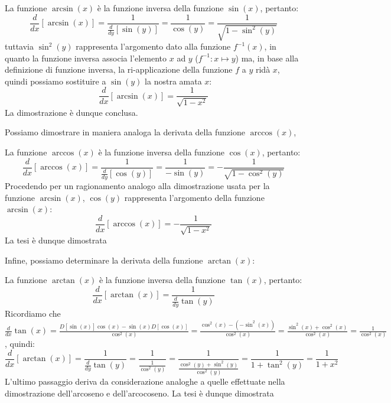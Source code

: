 \documentclass{report}
\begin{document}
\begin{myproof}
La funzione $\arcsin(x)$ è la funzione inversa della funzione $\sin(x)$, pertanto:
$$
	\frac{d}{dx}[\arcsin(x)] = \frac{1}{\frac{d}{dy}[\sin(y)]} = \frac{1}{\cos(y)} = \frac{1}{\sqrt{1-\sin^2(y)}}
$$
tuttavia $\sin^2(y)$ rappresenta l'argomento dato alla funzione $f^{-1}(x)$, in quanto la funzione inversa associa l'elemento $x$ ad $y$ ($f^{-1}: x \mapsto y$) ma, in base alla definizione di funzione inversa, la ri-applicazione della funzione $f$ a $y$ ridà $x$, quindi possiamo sostituire a $\sin(y)$ la nostra amata $x$:
$$
\frac{d}{dx}[\arcsin(x)] = \frac{1}{\sqrt{1-x^2}}
$$
La dimostrazione è dunque conclusa.
\end{myproof}
\par\noindent\smallskip Possiamo dimostrare in maniera analoga la derivata della funzione $\arccos(x)$,
\begin{myproof}
La funzione $\arccos(x)$ è la funzione inversa della funzione $\cos(x)$, pertanto:
$$
\frac{d}{dx}[\arccos(x)] = \frac{1}{\frac{d}{dy}[\cos(y)]} = \frac{1}{-\sin(y)} = -\frac{1}{\sqrt{1-\cos^2(y)}}
$$
Procedendo per un ragionamento analogo alla dimostrazione usata per la funzione $\arcsin(x)$, $\cos(y)$ rappresenta l'argomento della funzione $\arcsin(x)$:
$$
	\frac{d}{dx}[\arccos(x)] = -\frac{1}{\sqrt{1-x^2}}
$$
La tesi è dunque dimostrata
\end{myproof}
Infine, possiamo determinare la derivata della funzione $\arctan(x)$:
\begin{myproof}
La funzione $\arctan(x)$ è la funzione inversa della funzione $\tan(x)$, pertanto:
$$
	\frac{d}{dx}[\arctan(x)] = \frac{1}{\frac{d}{dy} \tan(y)}
$$
Ricordiamo che $\frac{d}{dx} \tan(x) = \frac{D[\sin(x)]\cos(x) - \sin(x)D[\cos(x)]}{\cos^2(x)} = \frac{\cos^2(x) - (-\sin^2(x))}{\cos^2(x)} = \frac{\sin^2(x) + \cos^2(x)}{\cos^2(x)} = \frac{1}{\cos^2(x)}$, quindi:
$$
	\frac{d}{dx}[\arctan(x)] = \frac{1}{\frac{d}{dy} \tan(y)} = \frac{1}{\frac{1}{\cos^2(y)}} = \frac{1}{\frac{\cos^2(y) + \sin^2(y)}{\cos^2(y)}} = \frac{1}{1 + \tan^2(y)} = \frac{1}{1+x^2}
$$
L'ultimo passaggio deriva da considerazione analoghe a quelle effettuate nella dimostrazione dell'arcoseno e dell'arcocoseno. La tesi è dunque dimostrata
\end{myproof}
\end{document}
